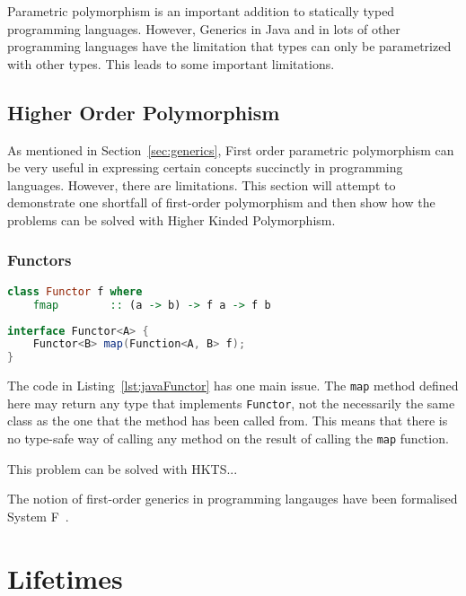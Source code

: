 Parametric polymorphism is an important addition to statically typed programming
languages. However, Generics in Java and in lots of other programming languages
have the limitation that types can only be parametrized with other types. 
This leads to some important limitations.

\subsection{Higher Order Polymorphism}
As mentioned in Section~\ref{sec:generics}, First order parametric polymorphism
can be very useful in expressing certain concepts succinctly in programming 
languages. However, there are limitations. This section will attempt to 
demonstrate one shortfall of first-order polymorphism and then show how the
problems can be solved with Higher Kinded Polymorphism.

\subsubsection{Functors}

\begin{lstlisting}[caption=Functor as defined in Haskell., language=Haskell, label={lst:haskellFunctor}]
class Functor f where
    fmap        :: (a -> b) -> f a -> f b
\end{lstlisting}

\begin{lstlisting}[caption=An attempt to define Functor in Java, language=Java, label={lst:javaFunctor}]
interface Functor<A> {
    Functor<B> map(Function<A, B> f);
}
\end{lstlisting}
The code in Listing~\ref{lst:javaFunctor} has one main issue. The \lstinline{map}
method defined here may return any type that implements \lstinline{Functor},
not the necessarily the same class as the one that the method has been called
from. This means that there is no type-safe way of calling any method on the
result of calling the \lstinline{map} function.

This problem can be solved with HKTS...

The notion of first-order generics in programming langauges have been formalised
System F~\cite{higher}. 


\section{Lifetimes}
